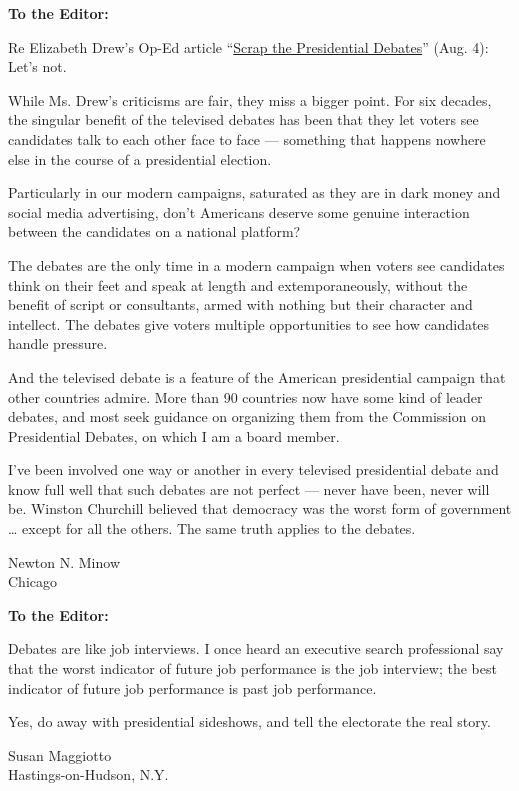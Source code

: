 \textbf{To the Editor:}

Re Elizabeth Drew's Op-Ed article
``\href{https://www.nytimes.com/2020/08/03/opinion/trump-biden-presidential-debates-2020.html?searchResultPosition=1}{Scrap
the Presidential Debates}'' (Aug. 4): Let's not.

While Ms. Drew's criticisms are fair, they miss a bigger point. For six
decades, the singular benefit of the televised debates has been that
they let voters see candidates talk to each other face to face ---
something that happens nowhere else in the course of a presidential
election.

Particularly in our modern campaigns, saturated as they are in dark
money and social media advertising, don't Americans deserve some genuine
interaction between the candidates on a national platform?

The debates are the only time in a modern campaign when voters see
candidates think on their feet and speak at length and extemporaneously,
without the benefit of script or consultants, armed with nothing but
their character and intellect. The debates give voters multiple
opportunities to see how candidates handle pressure.

And the televised debate is a feature of the American presidential
campaign that other countries admire. More than 90 countries now have
some kind of leader debates, and most seek guidance on organizing them
from the Commission on Presidential Debates, on which I am a board
member.

I've been involved one way or another in every televised presidential
debate and know full well that such debates are not perfect --- never
have been, never will be. Winston Churchill believed that democracy was
the worst form of government \ldots{} except for all the others. The
same truth applies to the debates.

Newton N. Minow\\
Chicago

\textbf{To the Editor:}

Debates are like job interviews. I once heard an executive search
professional say that the worst indicator of future job performance is
the job interview; the best indicator of future job performance is past
job performance.

Yes, do away with presidential sideshows, and tell the electorate the
real story.

Susan Maggiotto\\
Hastings-on-Hudson, N.Y.

